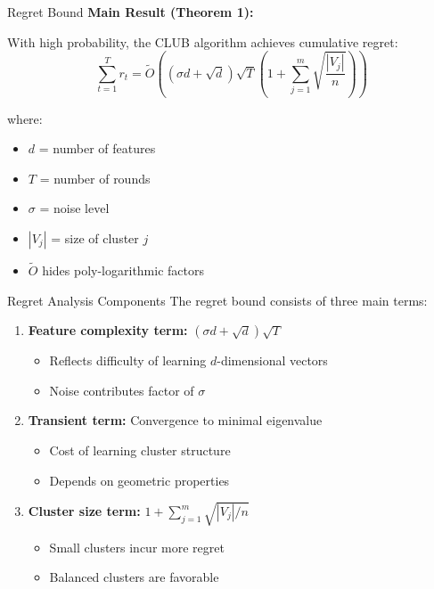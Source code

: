 \documentclass[11pt]{beamer}
\begin{document}
\begin{frame}{Regret Bound}
  \textbf{Main Result (Theorem 1):}
  
  With high probability, the CLUB algorithm achieves cumulative regret:
  $$\sum_{t=1}^{T} r_t = \tilde{O}\left(\left(\sigma d + \sqrt{d}\right) \sqrt{T} \left(1 + \sum_{j=1}^{m} \sqrt{\frac{|V_j|}{n}}\right)\right)$$
  
  where:
  \begin{itemize}
    \item $d$ = number of features
    \item $T$ = number of rounds
    \item $\sigma$ = noise level
    \item $|V_j|$ = size of cluster $j$
    \item $\tilde{O}$ hides poly-logarithmic factors
  \end{itemize}
\end{frame}

\begin{frame}{Regret Analysis Components}
  The regret bound consists of three main terms:
  
  \begin{enumerate}
    \item \textbf{Feature complexity term:} $(\sigma d + \sqrt{d})\sqrt{T}$
      \begin{itemize}
        \item Reflects difficulty of learning $d$-dimensional vectors
        \item Noise contributes factor of $\sigma$
      \end{itemize}
    
    \item \textbf{Transient term:} Convergence to minimal eigenvalue
      \begin{itemize}
        \item Cost of learning cluster structure
        \item Depends on geometric properties
      \end{itemize}
    
    \item \textbf{Cluster size term:} $1 + \sum_{j=1}^{m} \sqrt{|V_j|/n}$
      \begin{itemize}
        \item Small clusters incur more regret
        \item Balanced clusters are favorable
      \end{itemize}
  \end{enumerate}
\end{frame}
\end{document}
